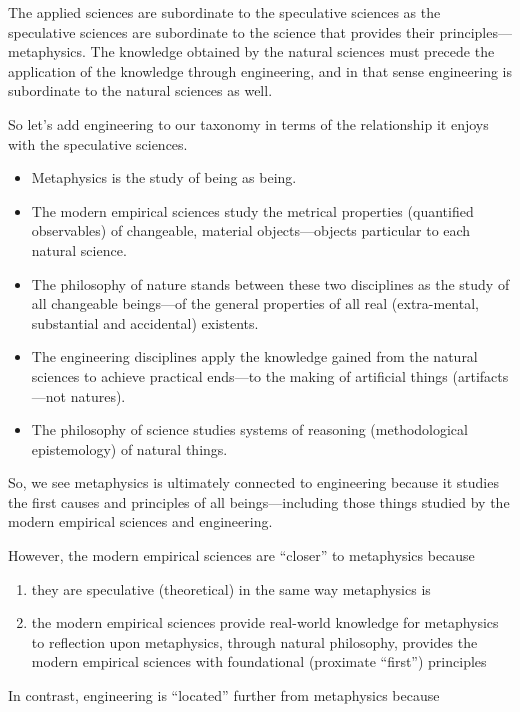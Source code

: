 The applied sciences are subordinate to the speculative sciences as the speculative sciences are subordinate to the science that provides their principles---metaphysics. The knowledge obtained by the natural sciences must precede the application of the knowledge through engineering, and in that sense engineering is subordinate to the natural sciences as well.

So let’s add engineering to our taxonomy in terms of the relationship it enjoys with the speculative sciences.

\begin{itemize}
\item Metaphysics is the study of being as being.
\item The modern empirical sciences study the metrical properties (quantified observables) of changeable, material objects---objects particular to each natural science.
\item The philosophy of nature stands between these two disciplines as the study of all changeable beings---of the general properties of all real (extra-mental, substantial and accidental) existents.
\item The engineering disciplines apply the knowledge gained from the natural sciences to achieve practical ends---to the making of artificial things (artifacts---not natures).
\item The philosophy of science studies systems of reasoning (methodological epistemology) of natural things.
\end{itemize}

So, we see metaphysics is ultimately connected to engineering because it studies the first causes and principles of all beings---including those things studied by the modern empirical sciences and engineering.

However, the modern empirical sciences are ``closer'' to metaphysics because

\begin{enumerate}
\item they are speculative (theoretical) in the same way metaphysics is
\item the modern empirical sciences provide real-world knowledge for metaphysics to reflection upon
metaphysics, through natural philosophy, provides the modern empirical sciences with foundational (proximate ``first'') principles
\end{enumerate}

In contrast, engineering is ``located'' further from metaphysics because

